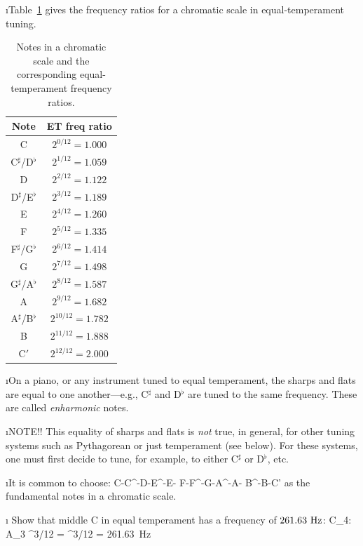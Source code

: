 \i Table~\ref{t:equal-temperament} gives the frequency
ratios for a chromatic scale in equal-temperament tuning.
%
\begin{table}[htbp]
\begin{center}
\begin{tabular}{|c|c|}
\hline
Note & ET freq ratio \\
\hline
C & $2^{0/12}=1.000$ \\
C$^\sharp$/D$^\flat$ & $2^{1/12}=1.059$ \\
D & $2^{2/12}=1.122$ \\
D$^\sharp$/E$^\flat$ & $2^{3/12}=1.189$ \\
E & $2^{4/12}=1.260$ \\
F & $2^{5/12}=1.335$ \\
F$^\sharp$/G$^\flat$ & $2^{6/12}=1.414$ \\
G & $2^{7/12}=1.498$ \\
G$^\sharp$/A$^\flat$ & $2^{8/12}=1.587$ \\
A & $2^{9/12}=1.682$ \\
A$^\sharp$/B$^\flat$ & $2^{10/12}=1.782$ \\
B & $2^{11/12}=1.888$ \\
C$'$ & $2^{12/12}=2.000$ \\
\hline
\end{tabular}
\caption{Notes in a chromatic scale and the 
corresponding equal-temperament frequency ratios.}
\label{t:equal-temperament}
\end{center}
\end{table}

\i On a piano, or any instrument tuned to
equal temperament, the sharps and flats are equal
to one another---e.g., C${}^\sharp$ and D${}^\flat$
are tuned to the same frequency.
These are called {\em enharmonic} notes.

\i NOTE!! This equality of sharps and flats is
{\em not} true, in general, for other tuning systems
such as Pythagorean or just temperament 
(see below).
For these systems, one must first decide to tune,
for example, to either C$^\sharp$ or D$^\flat$, etc.

\i It is common to choose:
% 
\be
{\rm C}-{\rm C}^\sharp-{\rm D}-{\rm E}^\flat-{\rm E}-%
{\rm F}-{\rm F}^\sharp-{\rm G}-{\rm A}^\flat-{\rm A}-%
{\rm B}^\flat-{\rm B}-{\rm C}'
\nonumber
\ee
%
as the fundamental notes in a chromatic scale.

\i \exer 
Show that middle C in equal temperament has a frequency
of $261.63~{\rm Hz}$:
%
\be
{\rm C}_4:\quad 
{\rm A}_3 ^{3/12} =
^{3/12} = 261.63~{\rm Hz}
\ee

